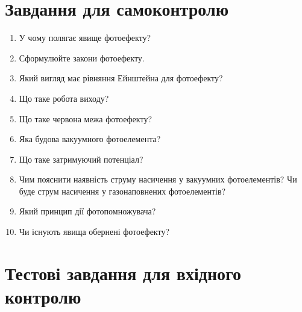 \documentclass[twocolumn]{el-author}
\begin{document}
\section{Завдання для самоконтролю}

\begin{enumerate}
	\item У чому полягає явище фотоефекту?
	\item Сформулюйте закони фотоефекту.
	\item Який вигляд має рівняння Ейнштейна для фотоефекту?
	\item Що таке робота виходу?
	\item Що таке червона межа фотоефекту?
	\item Яка будова вакуумного фотоелемента?
	\item Що таке затримуючий потенціал?
	\item Чим пояснити наявність струму насичення у вакуумних
		фотоелементів? Чи буде струм насичення у газонаповнених
		фотоелементів?
	\item Який принцип дії фотопомножувача?
	\item Чи існують явища обернені фотоефекту?
\end{enumerate}

\clearpage
\section{Тестові завдання для вхідного контролю}
\end{document}
